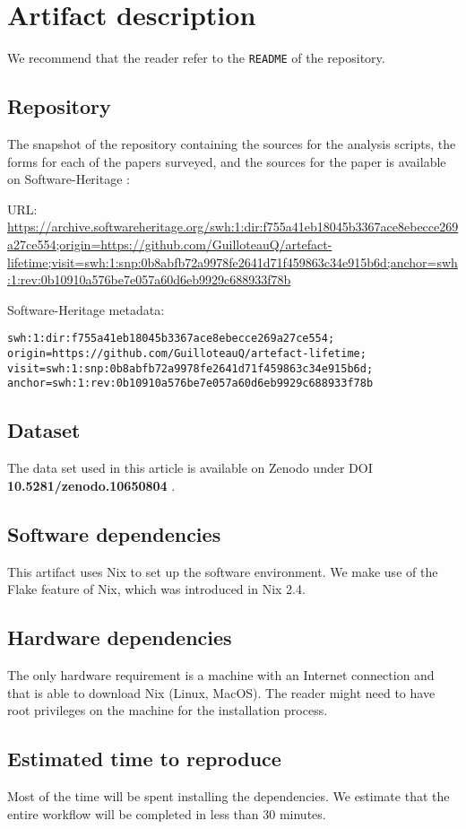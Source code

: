 \documentclass[sigconf,natbib=false]{acmart}
\begin{document}
\newpage

\appendix

\section{Artifact description}

We recommend that the reader refer to the \texttt{README} of the repository.

\subsection{Repository}

The snapshot of the repository containing the sources for the analysis scripts, the forms for each of the papers surveyed, and the sources for the paper is available on Software-Heritage \cite{artefact-lifetime}:

URL: \url{https://archive.softwareheritage.org/swh:1:dir:f755a41eb18045b3367ace8ebecce269a27ce554;origin=https://github.com/GuilloteauQ/artefact-lifetime;visit=swh:1:snp:0b8abfb72a9978fe2641d71f459863c34e915b6d;anchor=swh:1:rev:0b10910a576be7e057a60d6eb9929c688933f78b}


Software-Heritage metadata:

\begin{verbatim}
swh:1:dir:f755a41eb18045b3367ace8ebecce269a27ce554;
origin=https://github.com/GuilloteauQ/artefact-lifetime;
visit=swh:1:snp:0b8abfb72a9978fe2641d71f459863c34e915b6d;
anchor=swh:1:rev:0b10910a576be7e057a60d6eb9929c688933f78b
\end{verbatim}

\subsection{Dataset}

The data set used in this article is available on Zenodo under DOI \textbf{10.5281/zenodo.10650804} \cite{guilloteau_2024_10650804}.

\subsection{Software dependencies}

This artifact uses Nix to set up the software environment.
We make use of the Flake feature of Nix, which was introduced in Nix 2.4.

\subsection{Hardware dependencies}

The only hardware requirement is a machine with an Internet connection and that is able to download Nix (Linux, MacOS).
The reader might need to have root privileges on the machine for the installation process.

\subsection{Estimated time to reproduce}

Most of the time will be spent installing the dependencies.
We estimate that the entire workflow will be completed in less than 30 minutes.
\end{document}
